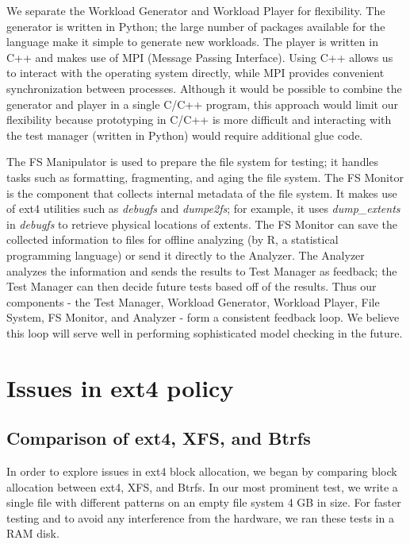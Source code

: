 \documentclass{acm_proc_article-sp}
\begin{document}
We separate the Workload Generator and Workload 
Player for flexibility. The generator is written 
in Python; the large number of packages available 
for the language make it simple to generate new 
workloads. The player is written in C++ and makes 
use of MPI (Message Passing Interface). Using C++ 
allows us to interact with the operating system 
directly, while MPI provides convenient synchronization 
between processes. Although it would be possible to 
combine the generator and player in a single C/C++ 
program, this approach would limit our flexibility 
because prototyping in C/C++ is more difficult and 
interacting with the test manager (written in Python) 
would require additional glue code.
 
The FS Manipulator is used to prepare the file 
system for testing; it handles tasks such as 
formatting, fragmenting, and aging the file system. 
The FS Monitor is the component that collects internal 
metadata of the file system. It makes use of ext4 
utilities such as \emph{debugfs} and \emph{dumpe2fs}; for example, 
it uses \emph{dump\_extents} in \emph{debugfs} to retrieve physical 
locations of extents. The FS Monitor can save the 
collected information to files for offline analyzing 
(by R, a statistical programming language) or send it 
directly to the Analyzer. The Analyzer analyzes the 
information and sends the results to Test Manager as 
feedback; the Test Manager can then decide future 
tests based off of the results. Thus our components 
- the Test Manager, Workload Generator, Workload 
Player, File System, FS Monitor, and Analyzer - 
form a consistent feedback loop. We believe this 
loop will serve well in performing sophisticated 
model checking in the future.
 


\section{Issues in ext4 policy}
\label{sec:Issues-in-ext4-policy}
\subsection{Comparison of ext4, XFS, and Btrfs}

In order to explore issues in ext4 block 
allocation, we began by comparing block 
allocation between ext4, XFS, and Btrfs. 
In our most prominent  test, we write a single 
file with different patterns on an empty file 
system 4 GB in size.  For faster testing and 
to avoid any interference from the hardware, 
we ran these tests in a RAM disk.  
 
\end{document}
